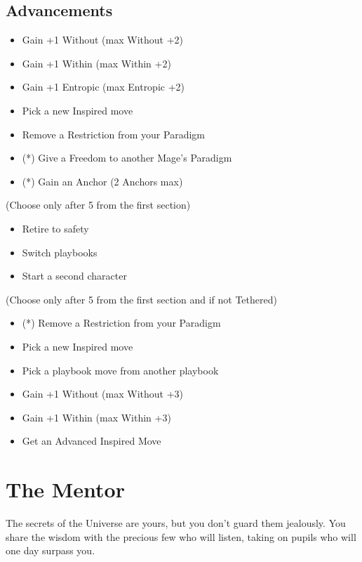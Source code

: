 \documentclass[
  oneside,
  statementpaper,
  9pt]{memoir}
\begin{document}
\hypertarget{advancements-2}{%
\subsection{Advancements}\label{advancements-2}}

\begin{itemize}
\tightlist
\item
  Gain +1 Without (max Without +2)
\item
  Gain +1 Within (max Within +2)
\item
  Gain +1 Entropic (max Entropic +2)
\item
  Pick a new Inspired move
\item
  Remove a Restriction from your Paradigm
\item
  (*) Give a Freedom to another Mage's Paradigm
\item
  (*) Gain an Anchor (2 Anchors max)
\end{itemize}

(Choose only after 5 from the first section)

\begin{itemize}
\tightlist
\item
  Retire to safety
\item
  Switch playbooks
\item
  Start a second character
\end{itemize}

(Choose only after 5 from the first section and if not Tethered)

\begin{itemize}
\tightlist
\item
  (*) Remove a Restriction from your Paradigm
\item
  Pick a new Inspired move
\item
  Pick a playbook move from another playbook
\item
  Gain +1 Without (max Without +3)
\item
  Gain +1 Within (max Within +3)
\item
  Get an Advanced Inspired Move
\end{itemize}

\newpage

\hypertarget{the-mentor}{%
\section{The Mentor}\label{the-mentor}}

The secrets of the Universe are yours, but you don't guard them
jealously. You share the wisdom with the precious few who will listen,
taking on pupils who will one day surpass you.
\end{document}
